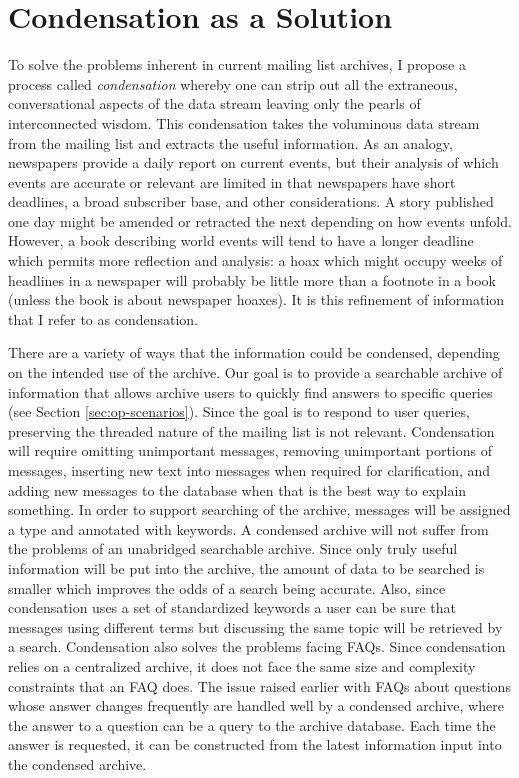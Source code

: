 \section{Condensation as a Solution}
To solve the problems inherent in current mailing list archives, I propose a
process called {\em condensation} whereby one can strip out all the extraneous,
conversational aspects of the data stream leaving only the pearls of
interconnected wisdom. This condensation takes the voluminous data stream from
the mailing list and extracts the useful information. As an analogy, newspapers
provide a daily report on current events, but their analysis of which events
are accurate or relevant are limited in that newspapers have short deadlines, a
broad subscriber base, and other considerations. A story published one day
might be amended or retracted the next depending on how events unfold.
However, a book describing world events will tend to have a longer deadline
which permits more reflection and analysis: a hoax which might occupy weeks of
headlines in a newspaper will probably be little more than a footnote in a book
(unless the book is about newspaper hoaxes). It is this refinement of
information that I refer to as condensation.

There are a variety of ways that the information could be condensed, depending
on the intended use of the archive. Our goal is to provide a searchable archive
of information that allows archive users to quickly find answers to specific
queries (see Section \ref{sec:op-scenarios}). Since the goal is to respond to
user queries, preserving the threaded nature of the mailing list is not
relevant.  Condensation will require omitting unimportant messages, removing
unimportant portions of messages, inserting new text into messages when
required for clarification, and adding new messages to the database when that
is the best way to explain something. In order to support searching of the
archive, messages will be assigned a type and annotated with keywords. A
condensed archive will not suffer from the problems of an unabridged searchable
archive. Since only truly useful information will be put into the archive, the
amount of data to be searched is smaller which improves the odds of a search
being accurate. Also, since condensation uses a set of standardized keywords a
user can be sure that messages using different terms but discussing the same
topic will be retrieved by a search. Condensation also solves the problems
facing FAQs. Since condensation relies on a centralized archive, it does not
face the same size and complexity constraints that an FAQ does. The issue
raised earlier with FAQs about questions whose answer changes frequently are
handled well by a condensed archive, where the answer to a question can be a
query to the archive database. Each time the answer is requested, it can be
constructed from the latest information input into the condensed archive.


